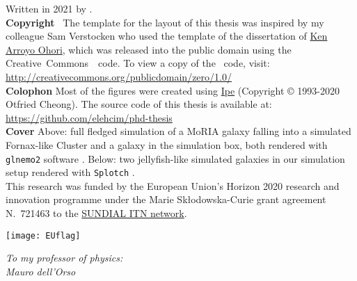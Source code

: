 \clearpage
\thispagestyle{empty}
\null%
\label{thesis:colophon}
\vfill
{}
\noindent Written in 2021 by {\makeatletter{\@author}\makeatother}.\\
\textbf{Copyright}~\cczero{} The template for the layout of this thesis was inspired by my colleague Sam Verstocken who used the template of the dissertation of \href{ken.mx}{Ken Arroyo Ohori},
which was released into the public domain using the Creative~Commons~\cczero{}~code.
To view a copy of the \cczero{}~code, visit:\\\url{http://creativecommons.org/publicdomain/zero/1.0/}\\
\textbf{Colophon}
Most of the figures were created using \href{http://ipe.otfried.org/}{Ipe} (Copyright © 1993-2020 Otfried Cheong).
The source code of this thesis is available at: \\
\url{https://github.com/elehcim/phd-thesis}\\
\textbf{Cover} Above: full fledged simulation of a MoRIA galaxy falling into a simulated Fornax-like Cluster and a galaxy in the simulation box, both rendered with \texttt{glnemo2} software \citep{Lambert2012}.
Below: two jellyfish-like simulated galaxies in our simulation setup rendered with \texttt{Splotch} \citep{Dolag2008}.\\[2ex]
This research was funded by the European Union's Horizon 2020 research and innovation programme under the Marie Sk\l odowska-Curie
grant agreement N.~721463 to the \href{www.astro.rug.nl/~sundial}{SUNDIAL ITN network}.
\begin{figure*}[bh!]
  \centering
  \texttt{[image: EUflag]}
\end{figure*}

\clearpage
\thispagestyle{empty}
\null%
\vfill
\begin{flushright}
  \textit{To my professor of physics:\\
      Mauro dell'Orso\\
      }
\end{flushright}
\vfill

